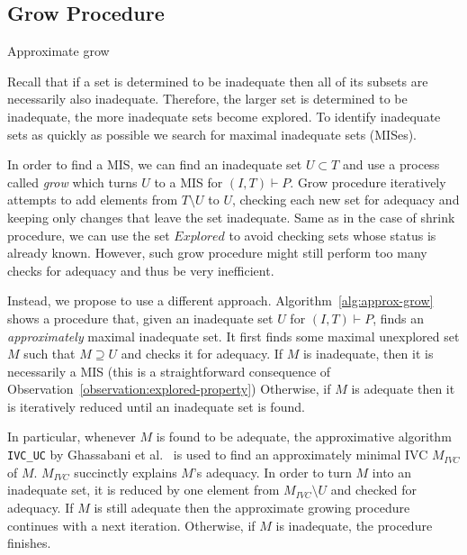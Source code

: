 \subsection{Grow Procedure}\label{sec:grow}
\begin{algorithm}[!t]
\label{alg:approx-grow}

\caption{Approximate grow}
\end{algorithm}

Recall that if a set is determined to be inadequate then all of its subsets are necessarily also inadequate. Therefore, the larger set is determined to be inadequate, the more inadequate sets become explored.  %
To identify inadequate sets as quickly as possible we search for maximal inadequate sets (MISes).

In order to find a MIS, we can find an inadequate set $U \subset T$ and use a process called \emph{grow} which turns $U$ to a MIS for $(I,T) \vdash P$.
Grow procedure iteratively attempts to add elements from $T \setminus U$ to $U$, checking each new set for adequacy and keeping only changes that leave the set inadequate. Same as in the case of shrink procedure, we can use the set $Explored$ to avoid checking sets whose status is already known.
However, such grow procedure might still perform too many checks for adequacy and thus be very inefficient.


Instead, we propose to use a different approach. Algorithm~\ref{alg:approx-grow} shows a procedure that, given an inadequate set $U$ for $(I, T) \vdash P$, finds an \emph{approximately} maximal inadequate set.
It first finds some maximal unexplored set $M$ such that $M \supseteq U$ and checks it for adequacy.
If $M$ is inadequate, then it is necessarily a MIS
(this is a straightforward consequence of Observation~\ref{observation:explored-property}) %
Otherwise, if $M$ is adequate then it is iteratively reduced until an inadequate set is found.

In particular, whenever $M$ is found to be adequate, the approximative algorithm \texttt{IVC\_UC} by Ghassabani et al.~\cite{Ghass16} is used to find an approximately minimal IVC $M_{IVC}$ of $M$.  $M_{IVC}$ succinctly explains $M$'s adequacy. In order to turn $M$ into an inadequate set, it is reduced by one element from $M_{IVC} \setminus U$ and checked for adequacy. If $M$ is still adequate then the approximate growing procedure continues with a next iteration. Otherwise, if $M$ is inadequate, the procedure finishes.


